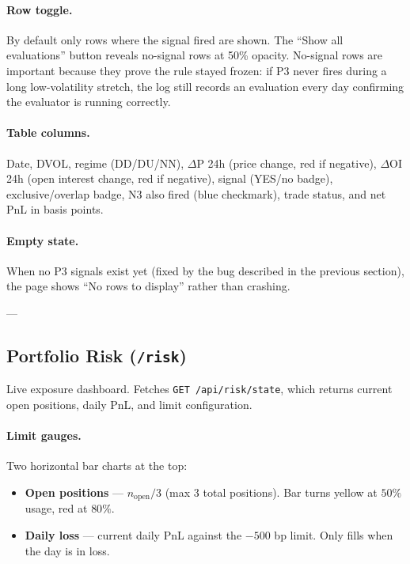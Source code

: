 \documentclass[12pt, a4paper]{article}
\begin{document}
\paragraph{Row toggle.}
By default only rows where the signal fired are shown. The ``Show all
evaluations'' button reveals no-signal rows at 50\% opacity. No-signal rows
are important because they prove the rule stayed frozen: if P3 never fires
during a long low-volatility stretch, the log still records an evaluation
every day confirming the evaluator is running correctly.

\paragraph{Table columns.}
Date, DVOL, regime (DD/DU/NN), $\Delta$P 24h (price change, red if negative),
$\Delta$OI 24h (open interest change, red if negative), signal (YES/no badge),
exclusive/overlap badge, N3 also fired (blue checkmark), trade status, and
net PnL in basis points.

\paragraph{Empty state.}
When no P3 signals exist yet (fixed by the bug described in the previous
section), the page shows ``No rows to display'' rather than crashing.

---

\subsection{Portfolio Risk (\texttt{/risk})}

Live exposure dashboard. Fetches \texttt{GET /api/risk/state}, which returns
current open positions, daily PnL, and limit configuration.

\paragraph{Limit gauges.}
Two horizontal bar charts at the top:
\begin{itemize}[noitemsep]
  \item \textbf{Open positions} — $n_{\text{open}} / 3$ (max 3 total positions).
        Bar turns yellow at $50\%$ usage, red at $80\%$.
  \item \textbf{Daily loss} — current daily PnL against the $-500$ bp limit.
        Only fills when the day is in loss.
\end{itemize}
\end{document}
